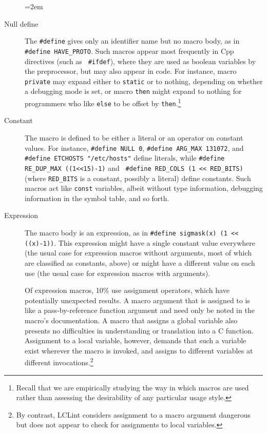 \documentclass[11pt]{article}
\begin{document}
\begin{description}
  \sloppy
  \emergencystretch=2em

\item[Null define]  The {\tt \#define} gives only an
  identifier name but no macro body, as in {\tt \#define \verb|HAVE_PROTO|}.
  Such macros appear most frequently in Cpp directives (such as {\tt
  \#ifdef}), where they are used as boolean variables by the preprocessor,
but may also appear in code.  For instance, macro {\tt private} may expand
either to {\tt static} or to nothing, depending on whether a debugging mode
is set, or macro {\tt then} might expand to nothing for programmers who
like {\tt else} to be offset by {\tt then}.\footnote{Recall that we are
  empirically studying the way in which macros are used rather than
  assessing the desirability of any particular usage style.}

\item[Constant] The macro is defined to be either a literal or an operator
  on constant values.  For instance, {\tt \#define NULL 0}, {\tt \#define
  \verb|ARG_MAX| 131072}, and {\tt \#define ETCHOSTS "/etc/hosts"} define
literals, while {\tt \#define \verb|RE_DUP_MAX| ((1<<15)-1)} and {\tt
\#define \verb|RED_COLS| (1 << \verb|RED_BITS|)} (where \verb|RED_BITS| is
a constant, possibly a literal) define constants.  Such macros act like
{\tt const} variables, albeit without type information, debugging
information in the symbol table, and so forth.

\item[Expression]  The macro body is an expression, as in {\tt \#define
  sigmask(x) (1 << ((x)-1))}.  This expression might have a single constant
value everywhere (the usual case for expression macros without arguments,
most of which are classified as constants, above) or might have a
different value on each use (the usual case for expression macros with
arguments).

Of expression macros, 10\% use assignment operators, which have potentially
unexpected results.  A macro argument that is assigned to is like a
pass-by-reference function argument and need only be noted in the macro's
documentation.  A macro that assigns a global variable also presents no
difficulties in understanding or translation into a C function.  Assignment
to a local variable, however, demands that such a variable exist wherever
the macro is invoked, and assigns to different variables at different
invocations.\footnote{By contrast, LCLint considers assignment to a macro
  argument dangerous but does not appear to check for assignments to local
  variables.}


\end{description}
\end{document}
